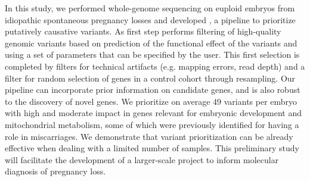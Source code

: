 In this study, we performed whole-genome sequencing on euploid embryos from idiopathic spontaneous pregnancy losses and developed \gp, a pipeline to prioritize putatively causative variants. As first step \gp performs filtering of high-quality genomic variants based on prediction of the functional effect of the variants and using a set of parameters that can be specified by the user. This first selection is completed by filters for technical artifacts (e.g. mapping errors, read depth) and a filter for random selection of genes in a control cohort through resampling. Our pipeline can incorporate prior information on candidate genes, and is also robust to the discovery of novel genes.  %
We prioritize on average 49 variants per embryo with high and moderate impact in genes relevant for embryonic development and mitochondrial metabolism, some of which were previously identified for having a role in miscarriages. We demonstrate that variant prioritization can be already effective when dealing with a limited number of samples. This preliminary study will facilitate the development of a larger-scale project to inform molecular diagnosis of pregnancy loss. 





